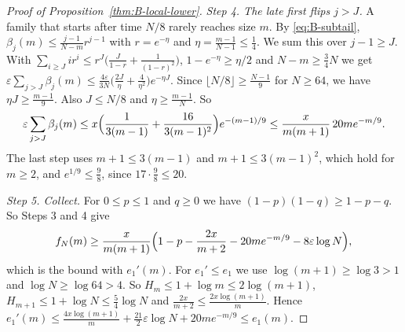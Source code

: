 \begin{proof}[Proof of Proposition~\ref{thm:B-local-lower}]
\emph{Step 4. The late first flips $j>J$.} A family that starts after time
$N/8$ rarely reaches size $m$. By \eqref{eq:B-subtail},
$\beta_j(m)\le\frac{j-1}{N-m}r^{j-1}$ with $r=e^{-\eta}$ and
$\eta=\frac{m-1}{N-1}\le\frac14$. We sum this over $j-1\ge J$. With
$\sum_{i\ge J}ir^i\le r^J\bigl(\frac J{1-r}+\frac1{(1-r)^2}\bigr)$, $1-e^{-\eta}\ge \eta/2$ and
$N-m\ge\frac34N$ we get
$\varepsilon\sum_{j>J}\beta_j(m)\le\frac{4\varepsilon}{3N}\bigl(\frac{2J}\eta+\frac4{\eta^2}\bigr)e^{-\eta J}$.
Since $\lfloor N/8\rfloor\ge\frac{N-1}9$ for $N\ge64$, we have $\eta J\ge\frac{m-1}9$. Also
$J\le N/8$ and $\eta\ge\frac{m-1}N$. So
\[
 \varepsilon\sum_{j>J}\beta_j(m)\le x\Bigl(\frac1{3(m-1)}+\frac{16}{3(m-1)^2}\Bigr)e^{-(m-1)/9}
 \le\frac{x}{m(m+1)}\,20me^{-m/9}.
\]
The last step uses $m+1\le3(m-1)$ and $m+1\le3(m-1)^2$, which hold for $m\ge2$, and
$e^{1/9}\le\frac98$, since $17\cdot\frac98\le20$.

\emph{Step 5. Collect.} For $0\le p\le1$ and $q\ge0$ we have
$(1-p)(1-q)\ge1-p-q$. So Steps 3 and 4 give
\[
 f_N(m)\ge\frac{x}{m(m+1)}\Bigl(1-p-\frac{2x}{m+2}-20me^{-m/9}-8\varepsilon\log N\Bigr),
\]
which is the bound with $e_1'(m)$. For $e_1'\le e_1$ we use $\log(m+1)\ge\log3>1$ and
$\log N\ge\log64>4$. So $H_m\le1+\log m\le2\log(m+1)$, $H_{m+1}\le1+\log N\le\frac54\log N$ and
$\frac{2x}{m+2}\le\frac{2x\log(m+1)}m$. Hence
$e_1'(m)\le\frac{4x\log(m+1)}m+\frac{21}2\varepsilon\log N+20me^{-m/9}\le e_1(m)$.
\end{proof}

